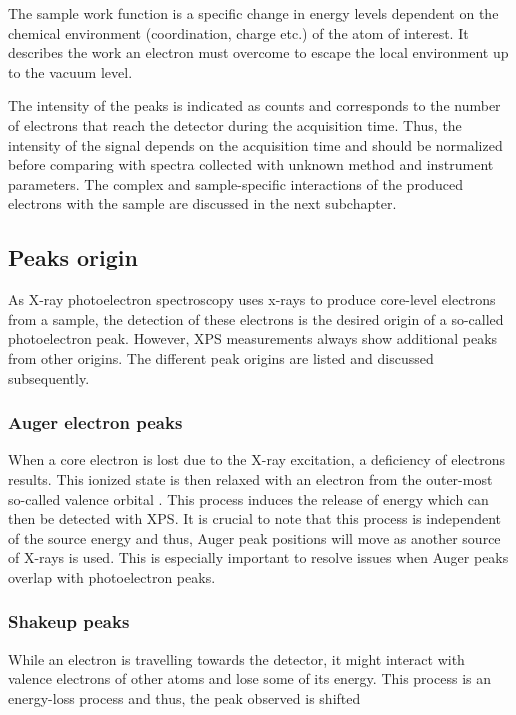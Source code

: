 The sample work function is a specific change in energy levels dependent on the chemical environment (coordination, charge etc.) of the atom of interest. It describes the work an electron must overcome to escape the local environment up to the vacuum level. 



The intensity of the peaks is indicated as counts and corresponds to the number of electrons that reach the detector during the acquisition time. Thus, the intensity of the signal depends on the acquisition time and should be normalized before comparing with spectra collected with unknown method and instrument parameters.
The complex and sample-specific interactions of the produced electrons with the sample are discussed in the next subchapter.

\subsection{Peaks origin} %

As X-ray photoelectron spectroscopy uses x-rays to produce core-level electrons from a sample, the detection of these electrons is the desired origin of a so-called photoelectron peak. However, XPS measurements always show additional peaks from other origins. The different peak origins are listed and discussed subsequently.

\subsubsection{Auger electron peaks}

When a core electron is lost due to the X-ray excitation, a deficiency of electrons results. This ionized state is then relaxed with an electron from the outer-most so-called valence orbital \cite{stevie_introduction_2020}. This process induces the release of energy which can then be detected with XPS. It is crucial to note that this process is independent of the source energy and thus, Auger peak positions will move as another source of X-rays is used. This is especially important to resolve issues when Auger peaks overlap with photoelectron peaks. 

\subsubsection{Shakeup peaks}

While an electron is travelling towards the detector, it might interact with valence electrons of other atoms and lose some of its energy. This process is an energy-loss process and thus, the peak observed is shifted 

